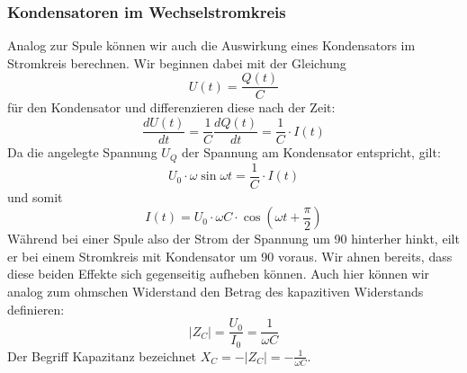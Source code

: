 \subsubsection{Kondensatoren im Wechselstromkreis}
Analog zur Spule können wir auch die Auswirkung eines Kondensators im Stromkreis berechnen.
Wir beginnen dabei mit der Gleichung
\begin{equation}
U(t) = \frac{Q(t)}{C}
\end{equation}
für den Kondensator und differenzieren diese nach der Zeit:
\begin{equation}
\frac{dU(t)}{dt} = \frac{1}{C}\frac{dQ(t)}{dt} = \frac{1}{C} \cdot I(t)
\end{equation}
Da die angelegte Spannung $U_Q$ der Spannung am Kondensator entspricht, gilt:
\begin{equation}
U_0\cdot \omega \sin \omega t = \frac{1}{C} \cdot I(t)
\end{equation}
und somit
\begin{equation}
I(t) = U_0\cdot \omega C \cdot\cos\left( \omega t + \frac{\pi}{2}\right)
\end{equation}
Während bei einer Spule also der Strom der Spannung um \unit{90}{\degree} hinterher hinkt, eilt er bei einem Stromkreis mit Kondensator um \unit{90}{\degree} voraus. Wir ahnen bereits, dass diese beiden Effekte sich gegenseitig aufheben können.
Auch hier können wir analog zum ohmschen Widerstand den Betrag des kapazitiven Widerstands definieren:
\begin{equation}
\left|Z_C\right| = \frac{U_0}{I_0} = \frac{1}{\omega C}
\end{equation}
Der Begriff Kapazitanz bezeichnet $X_C = -\left|Z_C\right| = -\frac{1}{\omega C}$.


